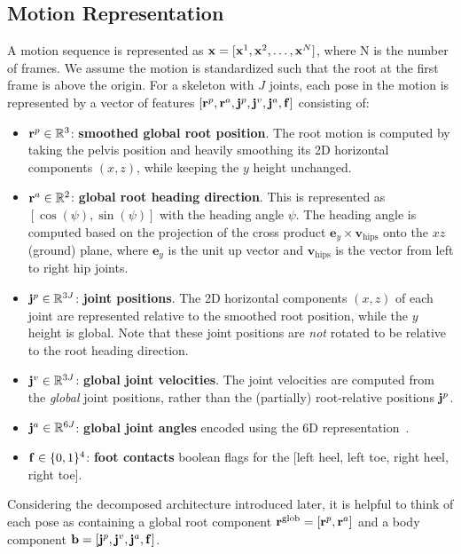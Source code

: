 \subsection{Motion Representation}
\label{sec:method:motion_rep}




A motion sequence is represented as $\mathbf{x} = [\mathbf{x}^1, \mathbf{x}^2, \ldots, \mathbf{x}^N]$, where N is the number of frames. We assume the motion is standardized such that the root at the first frame is above the origin. For a skeleton with $J$ joints, each pose in the motion is represented by a vector of features $[\mathbf{r}^p, \mathbf{r}^a, \mathbf{j}^p, \mathbf{j}^v, \mathbf{j}^a, \mathbf{f}]$ consisting of: 
\begin{itemize}
    \item $\mathbf{r}^p \in \mathbb{R}^3$: \textbf{smoothed global root position}. The root motion is computed by taking the pelvis position and heavily smoothing its 2D horizontal components $(x,z)$, while keeping the $y$ height unchanged. 
    \item $\mathbf{r}^a \in \mathbb{R}^2$: \textbf{global root heading direction}. This is represented as $[\cos(\psi), \sin(\psi)]$ with the heading angle $\psi$. The heading angle is computed based on the projection of the cross product $\mathbf{e}_y \times \mathbf{v}_\text{hips}$ onto the $xz$ (ground) plane, where $\mathbf{e}_y$ is the unit up vector and $\mathbf{v}_\text{hips}$ is the vector from left to right hip joints.
    \item $\mathbf{j}^p \in \mathbb{R}^{3J}$: \textbf{joint positions}. The 2D horizontal components $(x,z)$ of each joint are represented relative to the smoothed root position, while the $y$ height is global. Note that these joint positions are \textit{not} rotated to be relative to the root heading direction.
    \item $\mathbf{j}^v \in \mathbb{R}^{3J}$: \textbf{global joint velocities}. The joint velocities are computed from the \emph{global} joint positions, rather than the (partially) root-relative positions $\mathbf{j}^p$.
    \item $\mathbf{j}^a \in \mathbb{R}^{6J}$: \textbf{global joint angles} encoded using the 6D representation~\cite{zhou2019continuity}.
    \item $\mathbf{f} \in \{0, 1\}^4$: \textbf{foot contacts} boolean flags for the [left heel, left toe, right heel, right toe].
\end{itemize}

Considering the decomposed architecture introduced later, it is helpful to think of each pose as containing a global root component $\mathbf{r}^\text{glob}  = [\mathbf{r}^p, \mathbf{r}^a]$ and a body component $\mathbf{b} = [\mathbf{j}^p, \mathbf{j}^v, \mathbf{j}^a, \mathbf{f}]$. 

